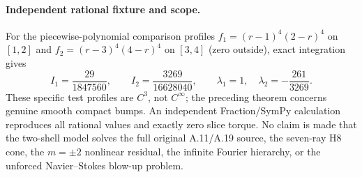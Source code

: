\paragraph{Independent rational fixture and scope.}
For the piecewise-polynomial comparison profiles
$f_1=(r-1)^4(2-r)^4$ on $[1,2]$ and
$f_2=(r-3)^4(4-r)^4$ on $[3,4]$ (zero outside),
exact integration gives
\[
 I_1=\frac{29}{1847560},\qquad
 I_2=\frac{3269}{16628040},\qquad
 \lambda_1=1,\quad \lambda_2=-\frac{261}{3269}.
\]
These specific test profiles are $C^3$, not $C^\infty$; the
preceding theorem concerns genuine smooth compact bumps.
An independent Fraction/SymPy calculation reproduces all rational
values and exactly zero slice torque. No claim is made that the
two-shell model solves the full original A.11/A.19 source, the
seven-ray H8 cone, the $m=\pm2$ nonlinear residual, the infinite
Fourier hierarchy, or the unforced Navier--Stokes blow-up problem.
